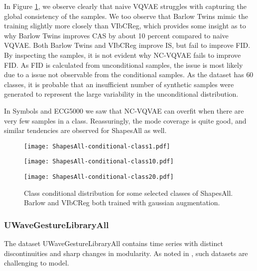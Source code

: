 \documentclass[../../thesis.tex]{subfiles}
\begin{document}
In Figure \ref{fig:Gauss_ShapesAll}, we observe clearly that naive VQVAE struggles with capturing the global consistency of the samples. We too observe that Barlow Twins mimic the training slightly more closely than VIbCReg, which provides some insight as to why Barlow Twins improves CAS by about 10 percent compared to naive VQVAE. Both Barlow Twins and VIbCReg improve IS, but fail to improve FID. By inspecting the samples, it is not evident why NC-VQVAE fails to improve FID. As FID is calculated from unconditional samples, the issue is most likely due to a issue not observable from the conditional samples. As the dataset has $60$ classes, it is probable that an insufficient number of synthetic samples were generated to represent the large variability in the unconditional distribution.\newline

In Symbols and ECG5000 we saw that NC-VQVAE can overfit when there are very few samples in a class. Reassuringly, the mode coverage is quite good, and similar tendencies are observed for ShapesAll as well. 
\begin{figure}[h]
    \centering
    \begin{minipage}[b]{0.32\textwidth}
        \centering
        \texttt{[image: ShapesAll-conditional-class1.pdf]}
    \end{minipage}
    \begin{minipage}[b]{0.32\textwidth}
        \centering
        \texttt{[image: ShapesAll-conditional-class10.pdf]}
    \end{minipage}
    \begin{minipage}[b]{0.32\textwidth}
        \centering
        \texttt{[image: ShapesAll-conditional-class20.pdf]}
    \end{minipage}
    \caption{Class conditional distribution for some selected classes of ShapesAll. Barlow and VIbCReg both trained with gaussian augmentation.}
    \label{fig:Gauss_ShapesAll}
\end{figure}

\subsubsection{UWaveGestureLibraryAll}
The dataset UWaveGestureLibraryAll contains time series with distinct discontinuities and sharp changes in modularity. As noted in \cite{TimeVQVAE}, such datasets are challenging to model.\newline
\end{document}
